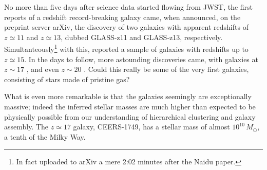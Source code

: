 \documentclass[useAMS,usenatbib,bibyear]{aa}
\begin{document}
No more than five days after science data started flowing from JWST, the first reports of a redshift record-breaking galaxy came, when \citet{Naidu2022a} announced, on the preprint server arXiv, the discovery of two galaxies with apparent redshifts of $z\simeq11$ and $z\simeq13$, dubbed GLASS-z11 and GLASS-z13, respectively.
Simultanteously\footnote{In fact uploaded to arXiv a mere 2:02 minutes after the Naidu paper.} with this, \citet{Castellano2022} reported a sample of galaxies with redshifts up to $z\simeq15$.
In the days to follow, more astounding discoveries came, with galaxies at
$z\sim17$ \citep{Donnan2022,Harikane2022}, and even
$z\sim20$ \citep{Yan2022}.
Could this really be some of the very first galaxies, consisting of stars made of pristine gas?

What is even more remarkable is that the galaxies seemingly are exceptionally massive; indeed the inferred stellar masses are much higher than expected to be physically possible from our understanding of hierarchical clustering and galaxy assembly.
The $z\simeq17$ galaxy, CEERS-1749, has a stellar mass of almost $10^{10}\,M_\odot$, a tenth of the Milky Way.
\end{document}
